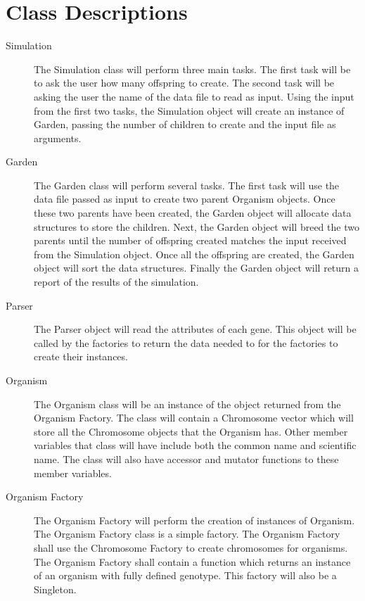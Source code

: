 \documentclass{article}
\begin{document}
\section{Class Descriptions}
\begin{description}

\item[Simulation] The Simulation class will perform three main tasks. The first task will be to ask the user how many offspring to create. The second task will be asking the user the name of the data file to read as input. Using the input from the first two tasks, the Simulation object will create an instance of Garden, passing the number of children to create and the input file as arguments.

\item[Garden] The Garden class will perform several tasks. The first task will use the data file passed as input to create two parent Organism objects. Once these two parents have been created, the Garden object will allocate data structures to store the children. Next, the Garden object will breed the two parents until the number of offspring created matches the input received from the Simulation object. Once all the offspring are created, the Garden object will sort the data structures. Finally the Garden object will return a report of the results of the simulation.

\item[Parser] The Parser object will read the attributes of each gene. This object will be called by the factories to return the data needed to for the factories to create their instances.

\item[Organism] The Organism class will be an instance of the object returned from the Organism Factory. The class will contain a Chromosome vector which will store all the Chromosome objects that the Organism has. Other member variables that class will have include both the common name and scientific name. The class will also have accessor and mutator functions to these member variables.

\item[Organism Factory]The Organism Factory will perform the creation of instances of Organism. The Organism Factory class is a simple factory. The Organism Factory shall use the Chromosome Factory to create chromosomes for organisms. The Organism Factory shall contain a function which returns an instance of an organism with fully defined genotype. This factory will also be a Singleton.


\end{description}
\end{document}
